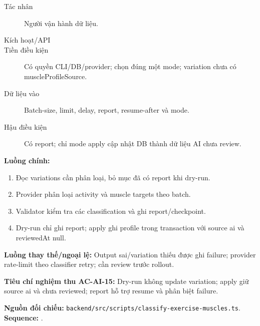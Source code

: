 \documentclass[12pt,a4paper]{article}
\newcommand{\evidence}[1]{{\small\nolinkurl{#1}}}
\begin{document}
\begin{description}
\item[Tác nhân] Người vận hành dữ liệu.
\item[Kích hoạt/API] 
\item[Tiền điều kiện] Có quyền CLI/DB/provider; chọn đúng một mode; variation chưa có muscleProfileSource.
\item[Dữ liệu vào] Batch-size, limit, delay, report, resume-after và mode.
\item[Hậu điều kiện] Có report; chỉ mode apply cập nhật DB thành dữ liệu AI chưa review.
\end{description}
\textbf{Luồng chính:}
\begin{enumerate}
  \item Đọc variations cần phân loại, bỏ mục đã có report khi dry-run.
  \item Provider phân loại activity và muscle targets theo batch.
  \item Validator kiểm tra các classification và ghi report/checkpoint.
  \item Dry-run chỉ ghi report; apply ghi profile trong transaction với source ai và reviewedAt null.
\end{enumerate}
\textbf{Luồng thay thế/ngoại lệ:} Output sai/variation thiếu được ghi failure; provider rate-limit theo classifier retry; cần review trước rollout.

\textbf{Tiêu chí nghiệm thu AC-AI-15:} Dry-run không update variation; apply giữ source ai và chưa reviewed; report hỗ trợ resume và phân biệt failure.

\textbf{Nguồn đối chiếu:} \evidence{backend/src/scripts/classify-exercise-muscles.ts}. \textbf{Sequence:} .
\end{document}
